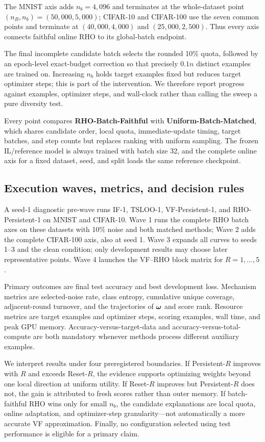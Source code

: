 The MNIST axis adds $n_b=4{,}096$ and terminates at the whole-dataset point
$(n_B,n_b)=(50{,}000,5{,}000)$; CIFAR-10 and CIFAR-100 use the seven common
points and terminate at $(40{,}000,4{,}000)$ and $(25{,}000,2{,}500)$.
Thus every axis connects faithful online RHO to its global-batch endpoint.

The final incomplete candidate batch selects the rounded 10\% quota, followed
by an epoch-level exact-budget correction so that precisely $0.1n$ distinct
examples are trained on. Increasing $n_b$ holds target examples fixed but
reduces target optimizer steps; this is part of the intervention. We therefore
report progress against examples, optimizer steps, and wall-clock rather than
calling the sweep a pure diversity test.

Every point compares \textbf{RHO-Batch-Faithful} with
\textbf{Uniform-Batch-Matched}, which shares candidate order, local quota,
immediate-update timing, target batches, and step counts but replaces ranking
with uniform sampling. The frozen IL/reference model is always trained with
batch size 32, and the complete online axis for a fixed dataset, seed, and split
loads the same reference checkpoint.

\subsection{Execution waves, metrics, and decision rules}

A seed-1 diagnostic pre-wave runs IF-1, TSLOO-1, VF-Persistent-1, and
RHO-Persistent-1 on MNIST and CIFAR-10. Wave 1 runs the complete RHO batch axes
on these datasets with 10\% noise and both matched methods; Wave 2 adds the
complete CIFAR-100 axis, also at seed 1. Wave 3 expands all curves to seeds
1--3 and the clean condition; only development results may choose later
representative points. Wave 4 launches the VF--RHO block matrix for
$R=1,\ldots,5$.

Primary outcomes are final test accuracy and best development loss. Mechanism
metrics are selected-noise rate, class entropy, cumulative unique coverage,
adjacent-round turnover, and the trajectories of ${\bm{\omega}}$ and score rank.
Resource metrics are target examples and optimizer steps, scoring examples,
wall time, and peak GPU memory. Accuracy-versus-target-data and
accuracy-versus-total-compute are both mandatory whenever methods process
different auxiliary examples.

We interpret results under four preregistered boundaries. If Persistent-$R$
improves with $R$ and exceeds Reset-$R$, the evidence supports optimizing
weights beyond one local direction at uniform utility. If Reset-$R$ improves
but Persistent-$R$ does not, the gain is attributed to fresh scores rather than
outer memory. If batch-faithful RHO wins only for small $n_b$, the candidate
explanations are local quota, online adaptation, and optimizer-step
granularity---not automatically a more accurate VF approximation. Finally, no
configuration selected using test performance is eligible for a primary
claim.
